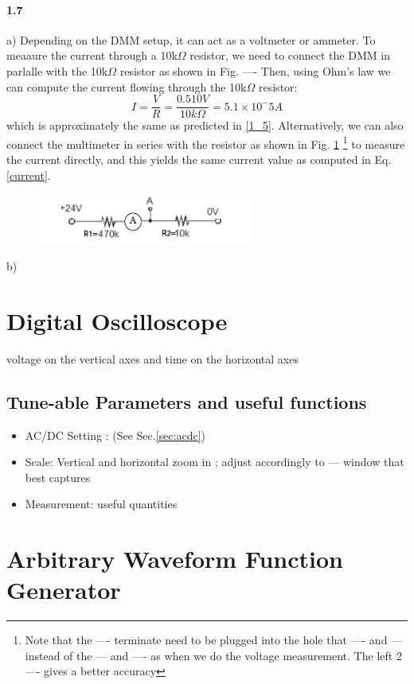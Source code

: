 \documentclass[10pt,letterpaper,oneside] {article}
\begin{document}
\paragraph{\textbf{1.7}} 
a) Depending on the DMM setup, it can act as a voltmeter or ammeter. To meaaure the current through a 10k$\Omega$ resistor, we need to connect the DMM in parlalle with the 10k$\Omega$ resistor as shown in Fig. ---- 
Then, using Ohm's law we can compute the current flowing through the 10k$\Omega$ resistor: 
\begin{equation}
I = \frac{V}{R}=\frac{0.510V}{10k\Omega}=5.1\times 10^-5 A
\label{current}
\end{equation}
which is approximately the same as predicted in \ref{1_5}. Alternatively, we can also connect the multimeter in series with the resistor as shown in Fig. \ref{ammeter}  \footnote{Note that the ---- terminate need to be plugged into the hole that  ---- and --- instead of the --- and ---- as when we do the voltage measurement. The left 2 ---- gives a better accuracy} to measure the current directly, and this yields the same current value as computed in Eq.\ref{current}.
\begin{figure}[h!]
\center
\includegraphics[width=200pt]{figure/ammeter}
\label{ammeter}
\end{figure}
b) 
\section{Digital Oscilloscope}
voltage on the vertical axes and time on the horizontal axes
\subsection{Tune-able Parameters and useful functions}
\begin{itemize}
\item AC/DC Setting : (See Sec.\ref{sec:acdc})
\item Scale: Vertical and horizontal zoom in ; adjust accordingly to --- window that best captures
\item Measurement: useful quantities 
\end{itemize}
\section{Arbitrary Waveform Function Generator}
\end{document}
